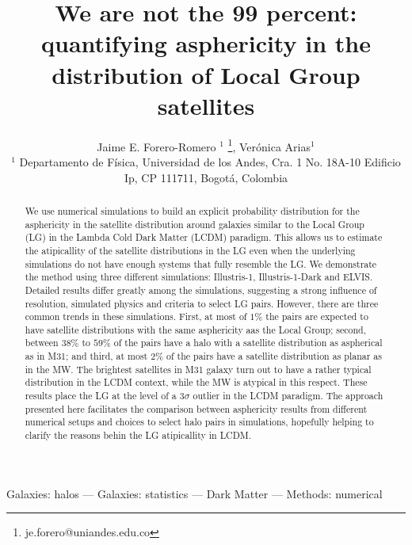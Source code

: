 \documentclass[a4paper,fleqn,usenatbib]{mnras}
\begin{document}
\title[LG satellites distribution asphericity]{We are not the 99 percent: quantifying
  asphericity in the distribution of Local Group satellites}
\author[J.E. Forero-Romero \& V. Arias]
{Jaime E. Forero-Romero $^{1}$ \thanks{je.forero@uniandes.edu.co},
Ver\'onica Arias$^1$\\
$^1$ Departamento de F\'isica, Universidad de los Andes, Cra. 1
  No. 18A-10 Edificio Ip, CP 111711, Bogot\'a, Colombia \\
}

\maketitle

\begin{abstract}
We use numerical simulations to build an explicit probability
distribution for the asphericity in the satellite distribution around
galaxies similar to the Local Group (LG) in the Lambda Cold Dark
Matter (LCDM) paradigm. 
This allows us to estimate the atipicallity
of the satellite distributions in the LG even when the underlying
simulations do not have enough systems that fully resemble the LG.
We demonstrate the method using three different simulations:
Illustris-1,  Illustris-1-Dark and ELVIS. 
Detailed results differ greatly among the simulations, suggesting a
strong influence of resolution, simulated physics and criteria to select
LG pairs.
However, there are three common trends in these simulations. 
First, at most of $1\%$ the pairs are expected to have satellite
distributions with the same asphericity aas the Local Group; second,
between $38\%$ to $59\%$ of the pairs have a halo with a satellite
distribution as aspherical as in M31; and third, at most $2\%$ of the
pairs have a satellite distribution as planar as in the MW. 
The brightest satellites in M31 galaxy turn out to have a rather
typical distribution in the LCDM context, while the MW is atypical in
this respect.  
These results place the LG at the level of a $3\sigma$ outlier
in the LCDM paradigm. 
The approach presented here facilitates the comparison between
asphericity results from different numerical setups and choices to
select halo pairs in simulations, hopefully helping to clarify the
reasons behin the LG atipicallity in LCDM. 
\end{abstract}

\begin{keywords}Galaxies: halos --- Galaxies: statistics --- Dark
  Matter --- Methods: numerical  
\end{keywords}
\end{document}
